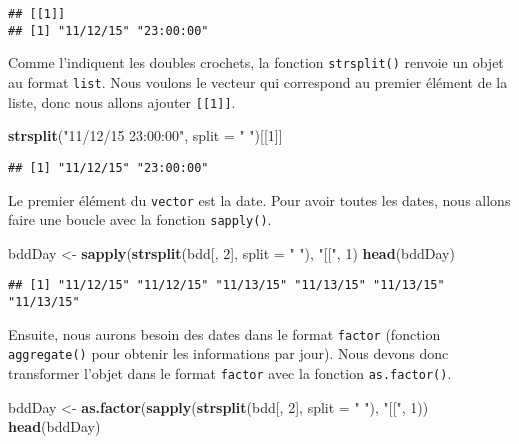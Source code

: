 \documentclass[]{book}
\newenvironment{Shaded}{\begin{snugshade}}{\end{snugshade}}
\newcommand{\KeywordTok}[1]{\textcolor[rgb]{0.13,0.29,0.53}{\textbf{#1}}}
\newcommand{\DataTypeTok}[1]{\textcolor[rgb]{0.13,0.29,0.53}{#1}}
\newcommand{\DecValTok}[1]{\textcolor[rgb]{0.00,0.00,0.81}{#1}}
\newcommand{\StringTok}[1]{\textcolor[rgb]{0.31,0.60,0.02}{#1}}
\newcommand{\NormalTok}[1]{#1}
\theoremstyle{definition}
\theoremstyle{definition}
\theoremstyle{definition}
\theoremstyle{remark}
\begin{document}
\begin{verbatim}
## [[1]]
## [1] "11/12/15" "23:00:00"
\end{verbatim}

Comme l'indiquent les doubles crochets, la fonction \texttt{strsplit()}
renvoie un objet au format \texttt{list}. Nous voulons le vecteur qui
correspond au premier élément de la liste, donc nous allons ajouter
\texttt{{[}{[}1{]}{]}}.

\begin{Shaded}
\begin{Highlighting}[]
\KeywordTok{strsplit}\NormalTok{(}\StringTok{"11/12/15 23:00:00"}\NormalTok{, }\DataTypeTok{split =} \StringTok{" "}\NormalTok{)[[}\DecValTok{1}\NormalTok{]]}
\end{Highlighting}
\end{Shaded}

\begin{verbatim}
## [1] "11/12/15" "23:00:00"
\end{verbatim}

Le premier élément du \texttt{vector} est la date. Pour avoir toutes les
dates, nous allons faire une boucle avec la fonction \texttt{sapply()}.

\begin{Shaded}
\begin{Highlighting}[]
\NormalTok{bddDay <-}\StringTok{ }\KeywordTok{sapply}\NormalTok{(}\KeywordTok{strsplit}\NormalTok{(bdd[, }\DecValTok{2}\NormalTok{], }\DataTypeTok{split =} \StringTok{" "}\NormalTok{), }\StringTok{"[["}\NormalTok{, }\DecValTok{1}\NormalTok{)}
\KeywordTok{head}\NormalTok{(bddDay)}
\end{Highlighting}
\end{Shaded}

\begin{verbatim}
## [1] "11/12/15" "11/12/15" "11/13/15" "11/13/15" "11/13/15" "11/13/15"
\end{verbatim}

Ensuite, nous aurons besoin des dates dans le format \texttt{factor}
(fonction \texttt{aggregate()} pour obtenir les informations par jour).
Nous devons donc transformer l'objet dans le format \texttt{factor} avec
la fonction \texttt{as.factor()}.

\begin{Shaded}
\begin{Highlighting}[]
\NormalTok{bddDay <-}\StringTok{ }\KeywordTok{as.factor}\NormalTok{(}\KeywordTok{sapply}\NormalTok{(}\KeywordTok{strsplit}\NormalTok{(bdd[, }\DecValTok{2}\NormalTok{], }\DataTypeTok{split =} \StringTok{" "}\NormalTok{), }\StringTok{"[["}\NormalTok{, }\DecValTok{1}\NormalTok{))}
\KeywordTok{head}\NormalTok{(bddDay)}
\end{Highlighting}
\end{Shaded}
\end{document}
